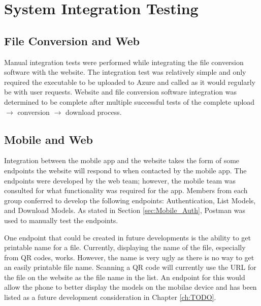 
\section{System Integration Testing}

	\subsection{File Conversion and Web}
		
		Manual integration tests were performed while integrating the file conversion software with the website. The integration test was relatively simple and only required the executable to be uploaded to Azure and called as it would regularly be with user requests. Website and file conversion software integration was determined to be complete after multiple successful tests of the complete upload $\rightarrow$ conversion $\rightarrow$ download process.

	\subsection{Mobile and Web}

		Integration between the mobile app and the website takes the form of some endpoints the website will respond to when contacted by the mobile app. The endpoints were developed by the web team; however, the mobile team was consulted for what functionality was required for the app. Members from each group conferred to develop the following endpoints: Authentication, List Models, and Download Models.  As stated in Section \ref{sec:Mobile_Auth}, Postman was used to manually test the endpoints.

		One endpoint that could be created in future developments is the ability to get printable name for a file.  Currently, displaying the name of the file, especially from QR codes, works.  However, the name is very ugly as there is no way to get an easily printable file name.  Scanning a QR code will currently use the URL for the file on the website as the file name in the list. An endpoint for this would allow the phone to better display the models on the mobilae device and has been listed as a future development consideration in Chapter \ref{ch:TODO}. 